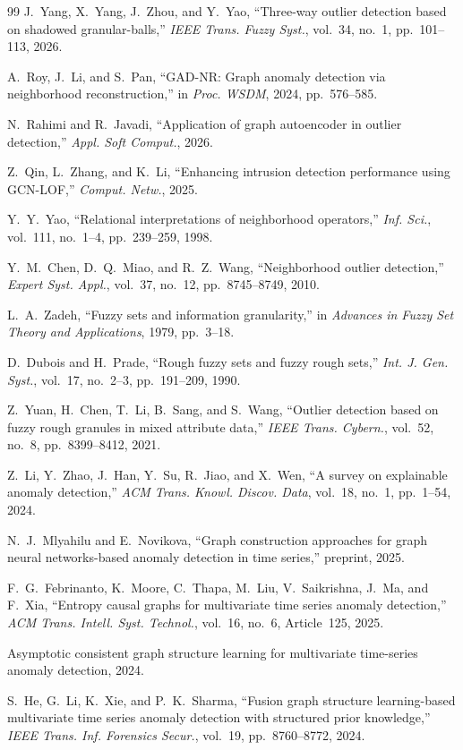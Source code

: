 \documentclass[lettersize,journal]{IEEEtran}
\begin{document}
\begin{thebibliography}{99}
J.~Yang, X.~Yang, J.~Zhou, and Y.~Yao, ``Three-way outlier detection based on shadowed
granular-balls,'' \textit{IEEE Trans. Fuzzy Syst.}, vol.~34, no.~1, pp.~101--113, 2026.

A.~Roy, J.~Li, and S.~Pan, ``GAD-NR: Graph anomaly detection via neighborhood reconstruction,''
in \textit{Proc. WSDM}, 2024, pp.~576--585.

N.~Rahimi and R.~Javadi, ``Application of graph autoencoder in outlier detection,''
\textit{Appl. Soft Comput.}, 2026.

Z.~Qin, L.~Zhang, and K.~Li, ``Enhancing intrusion detection performance using GCN-LOF,''
\textit{Comput. Netw.}, 2025.

Y.~Y.~Yao, ``Relational interpretations of neighborhood operators,''
\textit{Inf. Sci.}, vol.~111, no.~1--4, pp.~239--259, 1998.

Y.~M.~Chen, D.~Q.~Miao, and R.~Z.~Wang, ``Neighborhood outlier detection,''
\textit{Expert Syst. Appl.}, vol.~37, no.~12, pp.~8745--8749, 2010.

L.~A.~Zadeh, ``Fuzzy sets and information granularity,'' in \textit{Advances in Fuzzy Set Theory
and Applications}, 1979, pp.~3--18.

D.~Dubois and H.~Prade, ``Rough fuzzy sets and fuzzy rough sets,''
\textit{Int. J. Gen. Syst.}, vol.~17, no.~2--3, pp.~191--209, 1990.

Z.~Yuan, H.~Chen, T.~Li, B.~Sang, and S.~Wang, ``Outlier detection based on fuzzy rough granules
in mixed attribute data,'' \textit{IEEE Trans. Cybern.}, vol.~52, no.~8, pp.~8399--8412, 2021.

Z.~Li, Y.~Zhao, J.~Han, Y.~Su, R.~Jiao, and X.~Wen, ``A survey on explainable anomaly detection,''
\textit{ACM Trans. Knowl. Discov. Data}, vol.~18, no.~1, pp.~1--54, 2024.

N.~J.~Mlyahilu and E.~Novikova, ``Graph construction approaches for graph neural networks-based
anomaly detection in time series,'' preprint, 2025.

F.~G.~Febrinanto, K.~Moore, C.~Thapa, M.~Liu, V.~Saikrishna, J.~Ma, and F.~Xia,
``Entropy causal graphs for multivariate time series anomaly detection,''
\textit{ACM Trans. Intell. Syst. Technol.}, vol.~16, no.~6, Article~125, 2025.

Asymptotic consistent graph structure learning for multivariate time-series anomaly detection, 2024.

S.~He, G.~Li, K.~Xie, and P.~K.~Sharma, ``Fusion graph structure learning-based multivariate
time series anomaly detection with structured prior knowledge,''
\textit{IEEE Trans. Inf. Forensics Secur.}, vol.~19, pp.~8760--8772, 2024.

\end{thebibliography}
\end{document}
